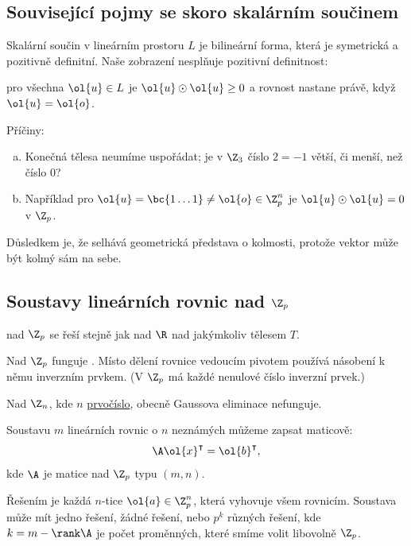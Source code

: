 \subsection{Související pojmy se skoro skalárním součinem}
Skalární součin v lineárním prostoru $L$ je bilineární forma, která je symetrická a pozitivně definitní. Naše zobrazení nesplňuje pozitivní definitnost:
\vspace{-1em}
\begin{center}
	pro všechna $\ol{u} \in L$ je $\ol{u} \odot \ol{u} \geq 0$ a rovnost nastane právě, když $\ol{u} = \ol{o}$.
\end{center}
\vspace{-1em}
Příčiny:
\vspace{-1em}
\begin{enumerate}[a)]
	\item Konečná tělesa neumíme uspořádat; je v $\Z_3$ číslo $2 = -1$ větší, či menší, než číslo 0?
	\item Například pro $\ol{u} = \bc{1 \dots 1} \not= \ol{o} \in \Z_p^n$ je $\ol{u} \odot \ol{u} = 0$ v $\Z_p$.
\end{enumerate}
Důsledkem je, že selhává geometrická představa o kolmosti, protože vektor může být kolmý sám na sebe.

\subsection{Soustavy lineárních rovnic nad \texorpdfstring{$\Z_p$}{Zp}}
 nad $\Z_p$ se řeší stejně jak nad $\R$ nad jakýmkoliv tělesem $T$.

Nad $\Z_p$ funguje . Místo dělení rovnice vedoucím pivotem používá násobení k němu inverzním prvkem. (V $\Z_p$ má každé nenulové číslo inverzní prvek.)

Nad $\Z_n$, kde $n$  \hyperref[prvocisla]{prvočíslo}, obecně Gaussova eliminace nefunguje.

Soustavu $m$ lineárních rovnic o $n$ neznámých můžeme zapsat maticově:
\begin{equation}
	\A \ol{x}^\intercal = \ol{b}^\intercal,
\end{equation}
kde $\A$ je matice nad $\Z_p$ typu $(m, n)$.

Řešením je každá $n$-tice $\ol{a} \in \Z_p^n$, která vyhovuje všem rovnicím. Soustava může mít jedno řešení, žádné řešení, nebo $p^k$ různých řešení, kde $k = m - \rank \A$ je počet proměnných, které smíme volit libovolně $\Z_p$.

